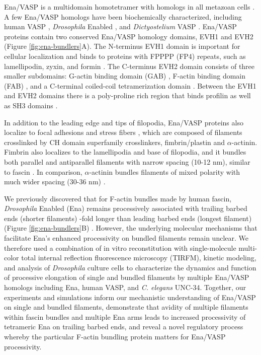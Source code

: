 Ena/VASP is a multidomain homotetramer with homologs in all metazoan cells \citep{sebe-pedros_insights_2013}. A few Ena/VASP homologs have been biochemically characterized, including human VASP \citep{bachmann_evh2_1999, chereau_understanding_2006, breitsprecher_clustering_2008, pasic_ena/vasp_2008, hansen_vasp_2010}, \textit{Drosophila} Enabled \citep{winkelman_ena/vasp_2014}, and \textit{Dictyostelium} VASP \citep{breitsprecher_clustering_2008}. Ena/VASP proteins contain two conserved Ena/VASP homology domains, EVH1 and EVH2 (Figure \ref{fig:ena-bundlers}A). The N-terminus EVH1 domain is important for cellular localization and binds to proteins with FPPPP (FP4) repeats, such as lamellipodin, zyxin, and formin \citep{ball_evh1_2001,bilancia_enabled_2014}. The C-terminus EVH2 domain consists of three smaller subdomains: G-actin binding domain (GAB) \citep{bachmann_evh2_1999,ferron_structural_2007}, F-actin binding domain (FAB) \citep{dominguez_actin_2011}, and a C-terminal coiled-coil tetramerization domain \citep{bachmann_evh2_1999,kuhnel_vasp_2004}. Between the EVH1 and EVH2 domains there is a poly-proline rich region that binds profilin as well as SH3 domains \citep{ferron_structural_2007,hansen_vasp_2010}.

In addition to the leading edge and tips of filopodia, Ena/VASP proteins also localize to focal adhesions and stress fibers \citep{reinhard_46/50_1992,brindle_focal-adhesion_1996}, which are composed of filaments crosslinked by CH domain superfamily crosslinkers, fimbrin/plastin and $\alpha$-actinin. Fimbrin also localizes to the lamellipodia and base of filopodia, and it bundles both parallel and antiparallel filaments with narrow spacing (10-12 nm), similar to fascin \citep{hanein_atomic_1998}. In comparison, $\alpha$-actinin bundles filaments of mixed polarity with much wider spacing (30-36 nm) \citep{sjoblom_alpha-actinin_2008}.

We previously discovered that for F-actin bundles made by human fascin, \textit{Drosophila} Enabled (Ena) remains processively associated with trailing barbed ends (shorter filaments) -fold longer than leading barbed ends (longest filament) (Figure \ref{fig:ena-bundlers}B) \citep{winkelman_ena/vasp_2014}. However, the underlying molecular mechanisms that facilitate Ena's enhanced processivity on bundled filaments remain unclear. We therefore used a combination of in vitro reconstitution with single-molecule multi-color total internal reflection fluorescence microscopy (TIRFM), kinetic modeling, and analysis of \textit{Drosophila} culture cells to characterize the dynamics and function of processive elongation of single and bundled filaments by multiple Ena/VASP homologs including Ena, human VASP, and \textit{C. elegans} UNC-34. Together, our experiments and simulations inform our mechanistic understanding of Ena/VASP on single and bundled filaments, demonstrate that avidity of multiple filaments within fascin bundles and multiple Ena arms leads to increased processivity of tetrameric Ena on trailing barbed ends, and reveal a novel regulatory process whereby the particular F-actin bundling protein matters for Ena/VASP processivity.


